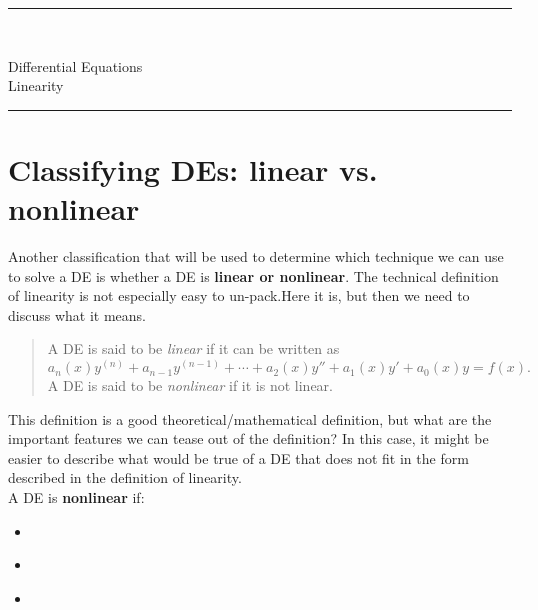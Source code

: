 \documentclass[12pt]{article}
\newcommand{\<}{\langle}
\renewcommand{\>}{\rangle}
\begin{document}
\noindent\rule{7in}{0.4pt}\\
\begin{center}
{\sc Differential Equations\\
Linearity}
\end{center}
\noindent\rule{7in}{0.4pt}
\section*{Classifying DEs:  linear vs. nonlinear}
\doublespacing
\noindent  Another classification that will be used to determine which technique we can use to solve a
DE is whether a DE is {\bf linear or nonlinear}.  The technical definition of linearity is not especially
easy to un-pack.Here it is, but then we need to discuss what it means.
	\begin{quote}
	A DE %
	is said to be {\it linear} if it can be written as \[ a_n(x)y^{(n)} + a_{n-1}y^{(n-1)} + \cdots + a_2(x)y'' + a_1(x)y' + a_0(x)y = f(x). \] A DE is said to be {\it nonlinear} if it is not linear.
	\end{quote}
\noindent  This definition is a good theoretical/mathematical definition, but what are the important
features we can tease out of the definition?  In this case, it might be easier to describe what would
be true of a DE that does not fit in the form described in the definition of linearity.\\

\noindent  A DE is {\bf nonlinear} if:
	\begin{itemize}
	\item \mbox{}\\ \vfill
		
	\item   \mbox{}\\ \vfill
	\item   \mbox{}\\ \vfill
	\end{itemize}
	
\end{document}
